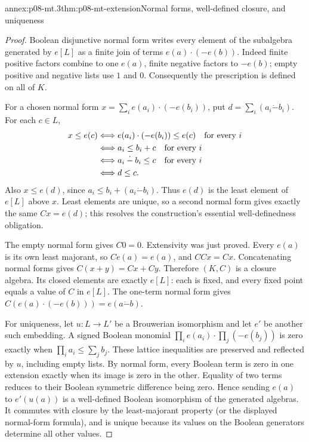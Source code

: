 \begin{annexitem}{annex:p08-mt.3}{thm:p08-mt-extension}{Normal forms, well-defined closure, and uniqueness}
\begin{proof}
Boolean disjunctive normal form writes every element of the subalgebra
generated by \(e[L]\) as a finite join of terms \(e(a)\cdot(-e(b))\).
Indeed finite positive factors combine to one \(e(a)\), finite negative
factors to \(-e(b)\); empty positive and negative lists use \(1\) and
\(0\). Consequently the prescription is defined on all of \(K\).

For a chosen normal form \(x=\sum_i e(a_i)\cdot(-e(b_i))\), put
\(d=\sum_i(a_i\mathbin{\dot{-}}b_i)\). For each \(c\in L\),
\[
 \begin{split}
 x\leq e(c)
 &\Longleftrightarrow
  e(a_i)\cdot(-e(b_i))\leq e(c)\quad\hbox{for every }i\\
 &\Longleftrightarrow a_i\leq b_i+c\quad\hbox{for every }i\\
 &\Longleftrightarrow a_i\mathbin{\dot{-}}b_i\leq c
     \quad\hbox{for every }i\\
 &\Longleftrightarrow d\leq c.
 \end{split}
\]
Also \(x\leq e(d)\), since
\(a_i\leq b_i+(a_i\mathbin{\dot{-}}b_i)\). Thus \(e(d)\) is the
least element of \(e[L]\) above \(x\). Least elements are unique, so a
second normal form gives exactly the same \(Cx=e(d)\); this resolves
the construction's essential well-definedness obligation.

The empty normal form gives \(C0=0\). Extensivity was just proved.
Every \(e(a)\) is its own least majorant, so \(Ce(a)=e(a)\), and
\(CCx=Cx\). Concatenating normal forms gives
\(C(x+y)=Cx+Cy\). Therefore \((K,C)\) is a closure algebra. Its
closed elements are exactly \(e[L]\): each is fixed, and every fixed
point equals a value of \(C\) in \(e[L]\). The one-term normal form
gives \(C(e(a)\cdot(-e(b)))=e(a\mathbin{\dot{-}}b)\).

For uniqueness, let \(u:L\to L'\) be a Brouwerian isomorphism and
let \(e'\) be another such embedding. A signed Boolean monomial
\(\prod_i e(a_i)\cdot\prod_j(-e(b_j))\) is zero exactly when
\(\prod_i a_i\leq\sum_j b_j\). These lattice inequalities are
preserved and reflected by \(u\), including empty lists. By normal
form, every Boolean term is zero in one extension exactly when its
image is zero in the other. Equality of two terms reduces to their
Boolean symmetric difference being zero. Hence sending \(e(a)\) to
\(e'(u(a))\) is a well-defined Boolean isomorphism of the generated
algebras. It commutes with closure by the least-majorant property (or
the displayed normal-form formula), and is unique because its values
on the Boolean generators determine all other values.


\end{proof}
\end{annexitem}
